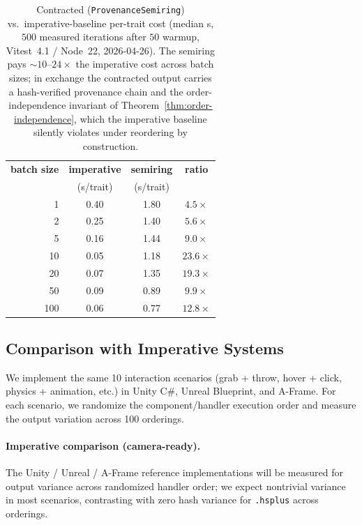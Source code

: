 \documentclass[sigconf,nonacm]{acmart}
\providecommand{\measuredFrom}[1]{}
\newcommand{\hsplus}{\texttt{.hsplus}}
\begin{document}
\begin{table}[t]
\centering
\caption{Contracted (\texttt{ProvenanceSemiring}) vs.\ imperative-baseline
per-trait cost (median \textmu{}s, $500$ measured iterations after $50$ warmup,
Vitest~4.1 / Node~22, 2026-04-26). The semiring pays
$\sim\!10$--$24\times$ the imperative cost across batch sizes; in
exchange the contracted output carries a hash-verified provenance chain
and the order-independence invariant of
Theorem~\ref{thm:order-independence}, which the imperative baseline
silently violates under reordering by construction.}
\label{tab:imperative-overhead}
\small
\measuredFrom{HoloScript/packages/core/src/traits/constants/__tests__/paper-trait-semiring-overhead.test.ts}%
\measuredFrom{HoloScript/packages/core/src/traits/constants/__tests__/paper-trait-imperative-baseline.test.ts}%
\measuredFrom{HoloScript/.bench-logs/paper-trait-semiring-overhead.json}%
\measuredFrom{HoloScript/.bench-logs/paper-trait-imperative-baseline.json}%
\begin{tabular}{rccc}
\toprule
\textbf{batch size} & \textbf{imperative} & \textbf{semiring} & \textbf{ratio} \\
                    & (\textmu{}s/trait)  & (\textmu{}s/trait) & \\
\midrule
  1 & 0.40 & 1.80 & $4.5\times$ \\
  2 & 0.25 & 1.40 & $5.6\times$ \\
  5 & 0.16 & 1.44 & $9.0\times$ \\
 10 & 0.05 & 1.18 & $23.6\times$ \\
 20 & 0.07 & 1.35 & $19.3\times$ \\
 50 & 0.09 & 0.89 & $9.9\times$ \\
100 & 0.06 & 0.77 & $12.8\times$ \\
\bottomrule
\end{tabular}
\end{table}

\subsection{Comparison with Imperative Systems}

We implement the same 10 interaction scenarios (grab +
throw, hover + click, physics + animation, etc.) in Unity
C\#, Unreal Blueprint, and A-Frame. For each scenario,
we randomize the component/handler execution order and
measure the output variation across 100 orderings.

\paragraph{Imperative comparison (camera-ready).}
The Unity / Unreal / A-Frame reference implementations will be
measured for output variance across randomized handler order;
we expect nontrivial variance in most scenarios, contrasting
with zero hash variance for \hsplus{} across orderings.
\end{document}
